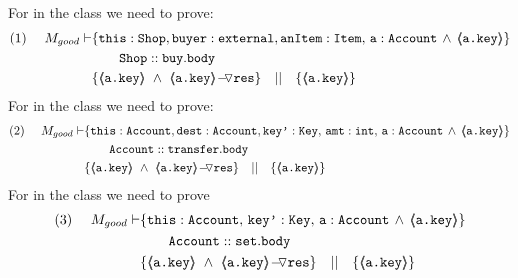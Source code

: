\begin{proofO}
\noindent
For    in the  class we need to prove:
\small
\begin{align*}
\text{(1)}  \ \ \ \ M_{good} \vdash 
		&	\{  \prg{this}:\prg{Shop}, \prg{buyer} : \prg{external}, \prg{anItem} : \prg{Item},\, \prg{a}:\prg{Account}\,\wedge\, 
				{\inside{\prg{a.key}}} \} \\
		& \SPT \prg{Shop}::\prg{buy}.\prg{body}\ \\  
		& \{ {\inside{\prg{a.key}}}\ \wedge\ {\PushASLong {\prg{res}} {\inside{\prg{a.key}}}}  \} \ \ \  || \ \ \ 
		   \{ {\inside{\prg{a.key}}} \}
\end{align*}
\normalsize
For  in the  class we need to prove:
\small
\begin{align*}
\text{(2)}  \ \ \ \ M_{good} \vdash 
		&	\{  \prg{this}:\prg{Account}, \prg{dest} : \prg{Account}, 
			\prg{key'} : \prg{Key},\, \prg{amt}:\prg{int},\, \prg{a}:\prg{Account}\,
			\wedge\,{\inside{\prg{a.key}}} \} \\
		&\SPT \prg{Account}::\prg{transfer}.\prg{body}\ \\  
		& \{ {\inside{\prg{a.key}}}\ \wedge\ {\PushASLong {\prg{res}} {\inside{\prg{a.key}}}}  \} \ \ \  || \ \ \ 
		   \{ {\inside{\prg{a.key}}} \}
\end{align*}
\normalsize
For  in the  class we need to prove
\small
\begin{align*}
\text{(3)}  \ \ \ \ M_{good} \vdash 
		&	\{  \prg{this}:\prg{Account},\,
			\prg{key'} : \prg{Key},\, \prg{a}:\prg{Account}\,
			\wedge\,{\inside{\prg{a.key}}} \} \\
		& \SPT \prg{Account}::\prg{set}.\prg{body}\ \\  
		& \{ {\inside{\prg{a.key}}}\ \wedge\ {\PushASLong {\prg{res}} {\inside{\prg{a.key}}}}  \} \ \ \  || \ \ \ 
		   \{ {\inside{\prg{a.key}}} \}
\end{align*}
\normalsize




\end{proofO}
